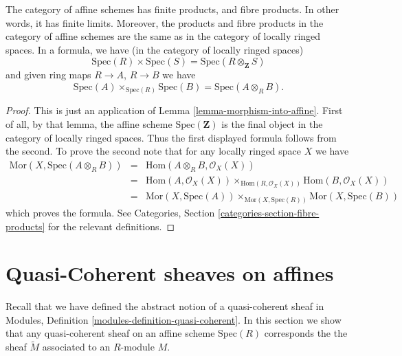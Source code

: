 \begin{lemma}
\label{lemma-fibre-product-affine-schemes}
The category of affine schemes has finite products, and fibre products.
In other words, it has finite limits. Moreover, the products
and fibre products in the category of affine schemes
are the same as in the category of locally ringed spaces.
In a formula, we have (in the category of locally ringed spaces)
$$
\text{Spec}(R) \times \text{Spec}(S) =
\text{Spec}(R \otimes_{\mathbf{Z}} S)
$$
and given ring maps $R \to A$, $R \to B$ we have
$$
\text{Spec}(A) \times_{\text{Spec}(R)} \text{Spec}(B)
=
\text{Spec}(A \otimes_R B).
$$
\end{lemma}

\begin{proof}
This is just an application of Lemma \ref{lemma-morphism-into-affine}.
First of all, by that lemma, the affine scheme
$\text{Spec}(\mathbf{Z})$ is the final object in the category
of locally ringed spaces. Thus the first displayed formula
follows from the second. To prove the second note that
for any locally ringed space $X$ we have
\begin{eqnarray*}
\text{Mor}(X, \text{Spec}(A \otimes_R B))
& = &
\text{Hom}(A \otimes_R B, \mathcal{O}_X(X)) \\
& = &
\text{Hom}(A, \mathcal{O}_X(X))
\times_{\text{Hom}(R, \mathcal{O}_X(X))}
\text{Hom}(B, \mathcal{O}_X(X)) \\
& = &
\text{Mor}(X, \text{Spec}(A))
\times_{\text{Mor}(X, \text{Spec}(R))}
\text{Mor}(X, \text{Spec}(B))
\end{eqnarray*}
which proves the formula.
See Categories, Section \ref{categories-section-fibre-products} for the
relevant definitions.
\end{proof}

















\section{Quasi-Coherent sheaves on affines}
\label{section-quasi-coherent-affine}

\noindent
Recall that we have defined the abstract notion of a quasi-coherent
sheaf in Modules, Definition \ref{modules-definition-quasi-coherent}.
In this section we show that any quasi-coherent sheaf on an affine
scheme $\text{Spec}(R)$ corresponds the the sheaf $\widetilde M$ associated to
an $R$-module $M$.


